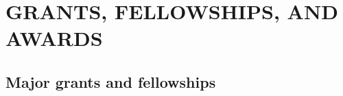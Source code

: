 \documentclass[11pt,english]{article}\usepackage[]{graphicx}\usepackage[]{xcolor}
\providecommand{\tabularnewline}{\\}
\begin{document}



\section*{GRANTS, FELLOWSHIPS, AND AWARDS}
\vspace{-0.5ex}

\subsection*{Major grants and fellowships}
\end{document}
